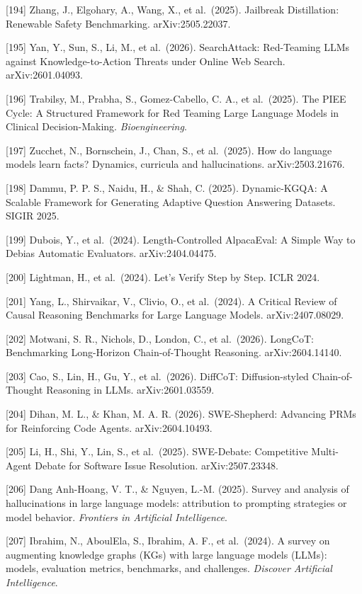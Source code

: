 {[}194{]} Zhang, J., Elgohary, A., Wang, X., et al.~(2025). Jailbreak Distillation: Renewable Safety Benchmarking. arXiv:2505.22037.

{[}195{]} Yan, Y., Sun, S., Li, M., et al.~(2026). SearchAttack: Red-Teaming LLMs against Knowledge-to-Action Threats under Online Web Search. arXiv:2601.04093.

{[}196{]} Trabilsy, M., Prabha, S., Gomez-Cabello, C. A., et al.~(2025). The PIEE Cycle: A Structured Framework for Red Teaming Large Language Models in Clinical Decision-Making. \emph{Bioengineering}.

{[}197{]} Zucchet, N., Bornschein, J., Chan, S., et al.~(2025). How do language models learn facts? Dynamics, curricula and hallucinations. arXiv:2503.21676.

{[}198{]} Dammu, P. P. S., Naidu, H., \& Shah, C. (2025). Dynamic-KGQA: A Scalable Framework for Generating Adaptive Question Answering Datasets. SIGIR 2025.

{[}199{]} Dubois, Y., et al.~(2024). Length-Controlled AlpacaEval: A Simple Way to Debias Automatic Evaluators. arXiv:2404.04475.

{[}200{]} Lightman, H., et al.~(2024). Let's Verify Step by Step. ICLR 2024.

{[}201{]} Yang, L., Shirvaikar, V., Clivio, O., et al.~(2024). A Critical Review of Causal Reasoning Benchmarks for Large Language Models. arXiv:2407.08029.

{[}202{]} Motwani, S. R., Nichols, D., London, C., et al.~(2026). LongCoT: Benchmarking Long-Horizon Chain-of-Thought Reasoning. arXiv:2604.14140.

{[}203{]} Cao, S., Lin, H., Gu, Y., et al.~(2026). DiffCoT: Diffusion-styled Chain-of-Thought Reasoning in LLMs. arXiv:2601.03559.

{[}204{]} Dihan, M. L., \& Khan, M. A. R. (2026). SWE-Shepherd: Advancing PRMs for Reinforcing Code Agents. arXiv:2604.10493.

{[}205{]} Li, H., Shi, Y., Lin, S., et al.~(2025). SWE-Debate: Competitive Multi-Agent Debate for Software Issue Resolution. arXiv:2507.23348.

{[}206{]} Dang Anh-Hoang, V. T., \& Nguyen, L.-M. (2025). Survey and analysis of hallucinations in large language models: attribution to prompting strategies or model behavior. \emph{Frontiers in Artificial Intelligence}.

{[}207{]} Ibrahim, N., AboulEla, S., Ibrahim, A. F., et al.~(2024). A survey on augmenting knowledge graphs (KGs) with large language models (LLMs): models, evaluation metrics, benchmarks, and challenges. \emph{Discover Artificial Intelligence}.

